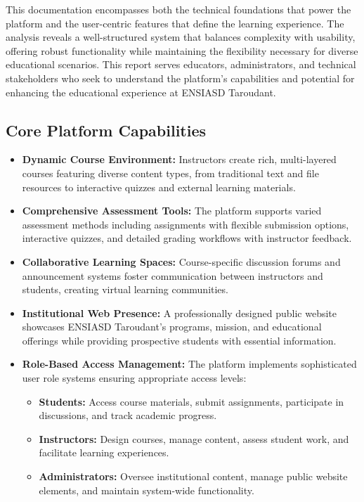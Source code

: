 \documentclass[12pt,a4paper]{article}
\begin{document}
This documentation encompasses both the technical foundations that power the platform and the user-centric features that define the learning experience. The analysis reveals a well-structured system that balances complexity with usability, offering robust functionality while maintaining the flexibility necessary for diverse educational scenarios. This report serves educators, administrators, and technical stakeholders who seek to understand the platform's capabilities and potential for enhancing the educational experience at ENSIASD Taroudant.

\subsection{Core Platform Capabilities}

\begin{itemize}
    \item \textbf{Dynamic Course Environment:} Instructors create rich, multi-layered courses featuring diverse content types, from traditional text and file resources to interactive quizzes and external learning materials.
    \item \textbf{Comprehensive Assessment Tools:} The platform supports varied assessment methods including assignments with flexible submission options, interactive quizzes, and detailed grading workflows with instructor feedback.
    \item \textbf{Collaborative Learning Spaces:} Course-specific discussion forums and announcement systems foster communication between instructors and students, creating virtual learning communities.
    \item \textbf{Institutional Web Presence:} A professionally designed public website showcases ENSIASD Taroudant's programs, mission, and educational offerings while providing prospective students with essential information.
    \item \textbf{Role-Based Access Management:} The platform implements sophisticated user role systems ensuring appropriate access levels:
    \begin{itemize}
        \item \textbf{Students:} Access course materials, submit assignments, participate in discussions, and track academic progress.
        \item \textbf{Instructors:} Design courses, manage content, assess student work, and facilitate learning experiences.
        \item \textbf{Administrators:} Oversee institutional content, manage public website elements, and maintain system-wide functionality.
    \end{itemize}
\end{itemize}
\end{document}
